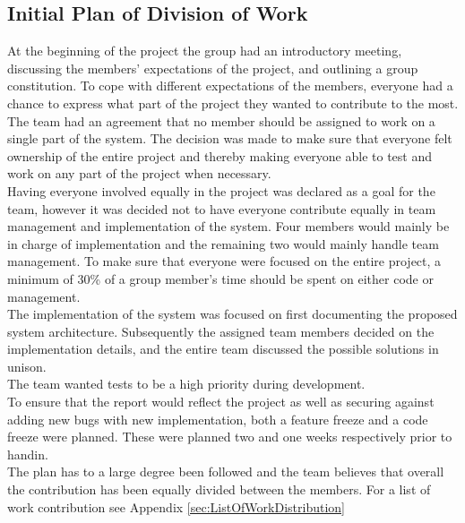 \subsection{Initial Plan of Division of Work}
At the beginning of the project the group had an introductory meeting, discussing the members’ expectations of the project, and outlining a group constitution. \newline
To cope with different expectations of the members, everyone had a chance to express what part of the project they wanted to contribute to the most. The team had an agreement that no member should be assigned to work on a single part of the system. The decision was made to make sure that everyone felt ownership of the entire project and thereby making everyone able to test and work on any part of the project when necessary. \\

Having everyone involved equally in the project was declared as a goal for the team, however it was decided not to have everyone contribute equally in team management and implementation of the system. Four members would mainly be in charge of implementation and the remaining two would mainly handle team management. To make sure that everyone were focused on the entire project, a minimum of 30\% of a group member’s time should be spent on either code or management.\\

The implementation of the system was focused on first documenting the proposed system architecture. Subsequently the assigned team members decided on the implementation details, and the entire team discussed the possible solutions in unison.\\

The team wanted tests to be a high priority during development.\\

To ensure that the report would reflect the project as well as securing against adding new bugs with new implementation, both a feature freeze and a code freeze were planned. These were planned two and one weeks respectively prior to handin.\\

The plan has to a large degree been followed and the team believes that overall the contribution has been equally divided between the members. For a list of work contribution see Appendix \ref{sec:ListOfWorkDistribution} 
